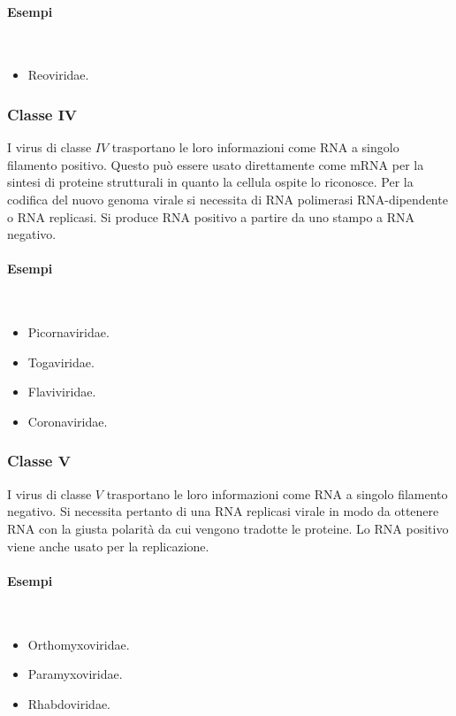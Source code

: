 			\paragraph{Esempi}\mbox{}\\
			\begin{center}
				\begin{itemize}
					\item Reoviridae.
				\end{itemize}
			\end{center}

		\subsubsection{Classe $\mathbf{IV}$}
		I virus di classe $IV$ trasportano le loro informazioni come RNA a singolo filamento positivo.
		Questo pu\`o essere usato direttamente come mRNA per la sintesi di proteine strutturali in quanto la cellula ospite lo riconosce.
		Per la codifica del nuovo genoma virale si necessita di RNA polimerasi RNA-dipendente o RNA replicasi.
		Si produce RNA positivo a partire da uno stampo a RNA negativo.
		
			\paragraph{Esempi}\mbox{}\\
			\begin{multicols}{2}
				\begin{itemize}
					\item Picornaviridae.
					\item Togaviridae.
					\item Flaviviridae.
					\item Coronaviridae.
				\end{itemize}
			\end{multicols}

		\subsubsection{Classe $\mathbf{V}$}
		I virus di classe $V$ trasportano le loro informazioni come RNA a singolo filamento negativo.
		Si necessita pertanto di una RNA replicasi virale in modo da ottenere RNA con la giusta polarit\`a da cui vengono tradotte le proteine.
		Lo RNA positivo viene anche usato per la replicazione.

			\paragraph{Esempi}\mbox{}\\
			\begin{multicols}{3}
				\begin{itemize}
					\item Orthomyxoviridae.
					\item Paramyxoviridae.
					\item Rhabdoviridae.
				\end{itemize}
			\end{multicols}


